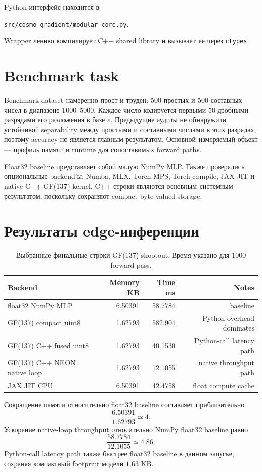 \documentclass[11pt]{article}
\begin{document}
Python-интерфейс находится в
\begin{center}
\texttt{src/cosmo\_gradient/modular\_core.py}.
\end{center}
Wrapper лениво компилирует C++ shared library и вызывает ее через
\texttt{ctypes}.

\section{Benchmark task}

Benchmark dataset намеренно прост и труден: $500$ простых и $500$ составных
чисел в диапазоне $1000$--$5000$. Каждое число кодируется первыми $50$
дробными разрядами его разложения в базе $e$. Предыдущие аудиты не обнаружили
устойчивой separability между простыми и составными числами в этих разрядах,
поэтому accuracy не является главным результатом. Основной измеряемый объект
--- профиль памяти и runtime для сопоставимых forward paths.

Float32 baseline представляет собой малую NumPy MLP. Также проверялись
опциональные backend'ы: Numba, MLX, Torch MPS, Torch compile, JAX JIT и native
C++ GF(137) kernel. C++ строки являются основным системным результатом,
поскольку сохраняют compact byte-valued storage.

\section{Результаты edge-инференции}

\begin{table}[h]
\centering
\caption{Выбранные финальные строки GF(137) shootout. Время указано для $1000$
forward-pass.}
\begin{tabular}{lrrr}
\toprule
Backend & Memory KB & Time ms & Notes \\
\midrule
float32 NumPy MLP & 6.50391 & 58.7784 & baseline \\
GF(137) compact uint8 & 1.62793 & 582.904 & Python overhead dominates \\
GF(137) C++ fused uint8 & 1.62793 & 40.1530 & Python-call latency path \\
GF(137) C++ NEON native loop & 1.62793 & 12.1055 & native throughput path \\
JAX JIT CPU & 6.50391 & 42.4758 & float compute cache \\
\bottomrule
\end{tabular}
\end{table}

Сокращение памяти относительно float32 baseline составляет приблизительно
\begin{equation}
    \frac{6.50391}{1.62793}\simeq4.
\end{equation}
Ускорение native-loop throughput относительно NumPy float32 baseline равно
\begin{equation}
    \frac{58.7784}{12.1055}\simeq4.86.
\end{equation}
Python-call latency path также быстрее float32 baseline в данном запуске,
сохраняя компактный footprint модели $1.63$ KB.
\end{document}
